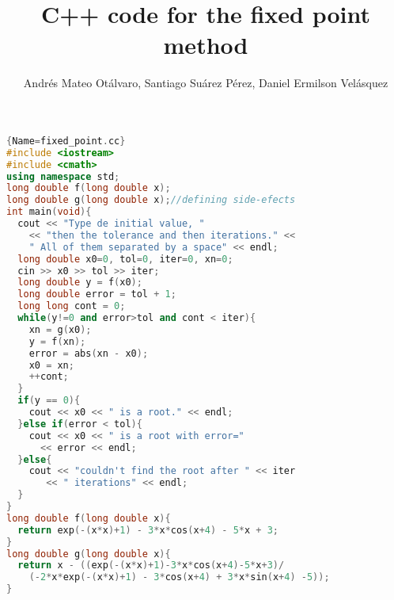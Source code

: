 \documentclass{article}
\author{Andrés Mateo Otálvaro, Santiago Suárez Pérez, Daniel Ermilson Velásquez}
\title{C++ code for the fixed point method}
\begin{document}
\maketitle
\begin{lstlisting}[language=C++, caption=Fixed point algorithm in C++]{Name=fixed_point.cc}
#include <iostream>
#include <cmath>
using namespace std;
long double f(long double x);
long double g(long double x);//defining side-efects
int main(void){
  cout << "Type de initial value, " 
    << "then the tolerance and then iterations." << 
    " All of them separated by a space" << endl;
  long double x0=0, tol=0, iter=0, xn=0;
  cin >> x0 >> tol >> iter;
  long double y = f(x0);
  long double error = tol + 1;
  long long cont = 0;
  while(y!=0 and error>tol and cont < iter){
    xn = g(x0);
    y = f(xn);
    error = abs(xn - x0);
    x0 = xn;
    ++cont;
  }
  if(y == 0){
    cout << x0 << " is a root." << endl;
  }else if(error < tol){
    cout << x0 << " is a root with error=" 
      << error << endl;
  }else{
    cout << "couldn't find the root after " << iter 
       << " iterations" << endl;
  }
}
long double f(long double x){
  return exp(-(x*x)+1) - 3*x*cos(x+4) - 5*x + 3;
}
long double g(long double x){
  return x - ((exp(-(x*x)+1)-3*x*cos(x+4)-5*x+3)/
    (-2*x*exp(-(x*x)+1) - 3*cos(x+4) + 3*x*sin(x+4) -5));
}

\end{lstlisting}
\end{document}
